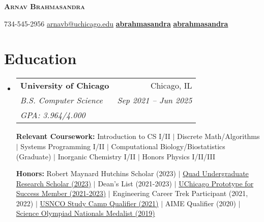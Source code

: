 \documentclass[letterpaper,11pt]{article}
\makeatletter
\newcommand{\phonesymbol}{\faPhone}
\newcommand{\linkedinsymbol}{\faLinkedin}
\newcommand{\githubsymbol}{\faGithub}
\newcommand{\mailsymbol}{\faEnvelope}
\newcommand{\printinfo}[2]{\mbox{{#1}\hspace{0.5em}#2\hspace{0.5em}}}
\newcommand{\mailaddress}[1]{\printinfo{\mailsymbol}{#1}}
\newcommand{\phone}[1]{\printinfo{\phonesymbol}{#1}}
\newcommand{\linkedin}[1]{\printinfo{\linkedinsymbol}{#1}}
\newcommand{\github}[1]{\printinfo{\githubsymbol}{#1}}
\newcommand{\courseItem}[1]{
    {\small #1 \vspace{-2pt}}
}
\newcommand{\honorsItem}[1]{
    {\small #1 \vspace{-2pt}}
}
\newcommand{\resumeEduSubheading}[5]{
  \vspace{-2pt}\item
    \begin{tabular*}{0.97\textwidth}[t]{l@{\extracolsep{\fill}}r}
      \textbf{#1} & #2 \\
      \textit{\small#3} & \textit{\small #4} \\
      \textit{\small#5}
    \end{tabular*}\vspace{-7pt}
}
\newcommand{\resumeSubHeadingListStart}{\begin{itemize}[leftmargin=0.15in, label={}]}
\newcommand{\resumeSubHeadingListEnd}{\end{itemize}}
\makeatother
\begin{document}

\begin{center}
    \textbf{\Huge \scshape Arnav Brahmasandra} \\ \vspace{1pt}
    
    \phone{734-545-2956} 
    \mailaddress{\href{mailto:arnavb@uchicago.edu}{arnavb@uchicago.edu}}
    \linkedin{\href{https://www.linkedin.com/in/abrahmasandra/}{\textbf{abrahmasandra}}}
    \github{\href{https://github.com/abrahmasandra}{\textbf{abrahmasandra}}}
\end{center}


\section{Education}
  \resumeSubHeadingListStart
    \resumeEduSubheading
      {University of Chicago}{Chicago, IL}
      {B.S. Computer Science}{Sep 2021 -- Jun 2025}{GPA: 3.964/4.000} \newline

    \textbf{Relevant Coursework:} \courseItem{Introduction to CS I/II $|$ Discrete Math/Algorithms $|$ Systems Programming I/II $|$ Computational Biology/Biostatistics (Graduate) $|$ Inorganic Chemistry I/II $|$ Honors Physics I/II/III}
    
    \textbf{Honors:} \honorsItem{Robert Maynard Hutchins Scholar (2023) $|$ \href{https://ugradresearchsymposium.omeka.net/items/show/120}{Quad Undergraduate Research Scholar (2023)} $|$ Dean's List (2021-2023) $|$ \href{https://careeradvancement.uchicago.edu/careers-in/engineering/prototype-for-success/class-of-2025}{UChicago Prototype for Success Member (2021-2023)} $|$ Engineering Career Trek Participant (2021, 2022) $|$  \href{https://www.acs.org/content/acs/en/pressroom/newsreleases/2021/may/2021-chemistry-olympiad-virtual-study-camp-students-named.html}{USNCO Study Camp Qualifier (2021)} $|$ AIME Qualifier (2020) $|$ \href{https://www.soinc.org/sites/default/files/uploaded_files/2019_Final_C_results_by_rank.pdf}{Science Olympiad Nationals Medalist (2019)}}
  \resumeSubHeadingListEnd
\end{document}
